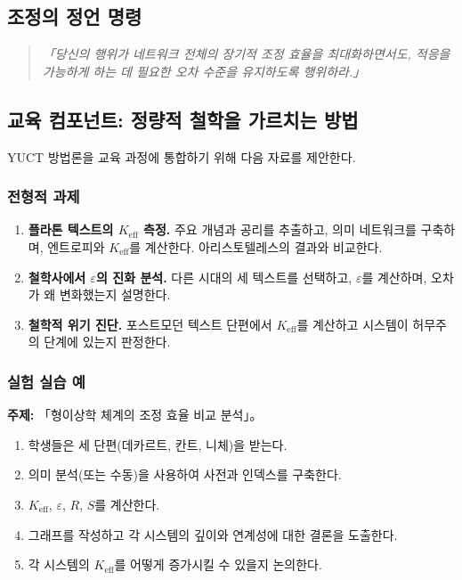 \documentclass[11pt,a4paper]{article}
\newcommand{\eps}{\varepsilon}
\begin{document}
	\subsection{조정의 정언 명령}
	
	\begin{quote}
		\textit{「당신의 행위가 네트워크 전체의 장기적 조정 효율을 최대화하면서도, 적응을 가능하게 하는 데 필요한 오차 수준을 유지하도록 행위하라.」}
	\end{quote}
	
	\subsection{교육 컴포넌트: 정량적 철학을 가르치는 방법}
	\label{sec:educational}
	
	YUCT 방법론을 교육 과정에 통합하기 위해 다음 자료를 제안한다.
	
	\subsubsection{전형적 과제}
	
	\begin{enumerate}[label=(\arabic*)]
		\item \textbf{플라톤 텍스트의 \(K_{\mathrm{eff}}\) 측정.} 주요 개념과 공리를 추출하고, 의미 네트워크를 구축하며, 엔트로피와 \(K_{\mathrm{eff}}\)를 계산한다. 아리스토텔레스의 결과와 비교한다.
		\item \textbf{철학사에서 \(\eps\)의 진화 분석.} 다른 시대의 세 텍스트를 선택하고, \(\eps\)를 계산하며, 오차가 왜 변화했는지 설명한다.
		\item \textbf{철학적 위기 진단.} 포스트모던 텍스트 단편에서 \(K_{\mathrm{eff}}\)를 계산하고 시스템이 허무주의 단계에 있는지 판정한다.
	\end{enumerate}
	
	\subsubsection{실험 실습 예}
	
	\textbf{주제:} 「형이상학 체계의 조정 효율 비교 분석」。
	
	\begin{enumerate}
		\item 학생들은 세 단편(데카르트, 칸트, 니체)을 받는다.
		\item 의미 분석(또는 수동)을 사용하여 사전과 인덱스를 구축한다.
		\item \(K_{\mathrm{eff}}\), \(\eps\), \(R\), \(S\)를 계산한다.
		\item 그래프를 작성하고 각 시스템의 깊이와 연계성에 대한 결론을 도출한다.
		\item 각 시스템의 \(K_{\mathrm{eff}}\)를 어떻게 증가시킬 수 있을지 논의한다.
	\end{enumerate}
	
\end{document}
